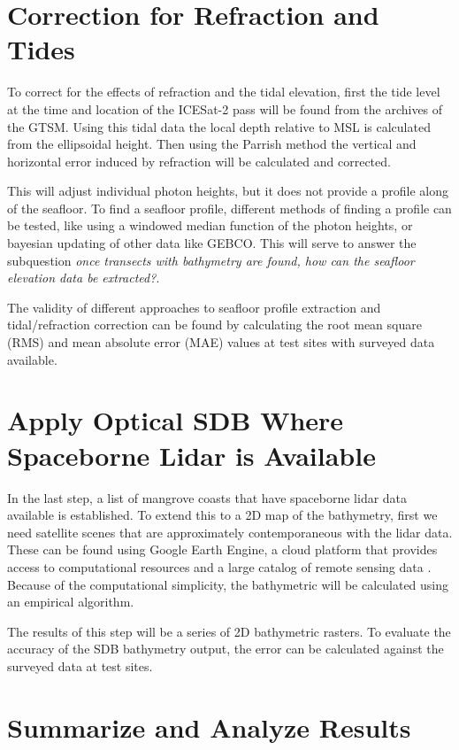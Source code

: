 \section{Correction for Refraction and Tides}

To correct for the effects of refraction and the tidal elevation, first the tide level at the time and location of the ICESat-2 pass will be found from the archives of the GTSM.  Using this tidal data the local depth relative to MSL is calculated from the ellipsoidal height. Then using the Parrish method the vertical and horizontal error induced by refraction will be calculated and corrected.

This will adjust individual photon heights, but it does not provide a profile along of the seafloor. To find a seafloor profile, different methods of finding a profile can be tested, like using a windowed median function of the photon heights, or bayesian updating of other data like GEBCO. This will serve to answer the subquestion \emph{once transects with bathymetry are found, how can the seafloor elevation data be extracted?}.

The validity of different approaches to seafloor profile extraction and tidal/refraction correction can be found by calculating the root mean square (RMS) and mean absolute error (MAE) values at test sites with surveyed data available.

\section{Apply Optical SDB Where Spaceborne Lidar is Available}

In the last step, a list of mangrove coasts that have spaceborne lidar data available is established. To extend this to a 2D map of the bathymetry, first we need satellite scenes that are approximately contemporaneous with the lidar data. These can be found using Google Earth Engine, a cloud platform that provides access to computational resources and a large catalog of remote sensing data \parencite{Gorelick2017a}. Because of the computational simplicity, the bathymetric will be calculated using an empirical algorithm.

The results of this step will be a series of 2D bathymetric rasters. To evaluate the accuracy of the SDB bathymetry output, the error can be calculated against the surveyed data at test sites.

\section{Summarize and Analyze Results}

